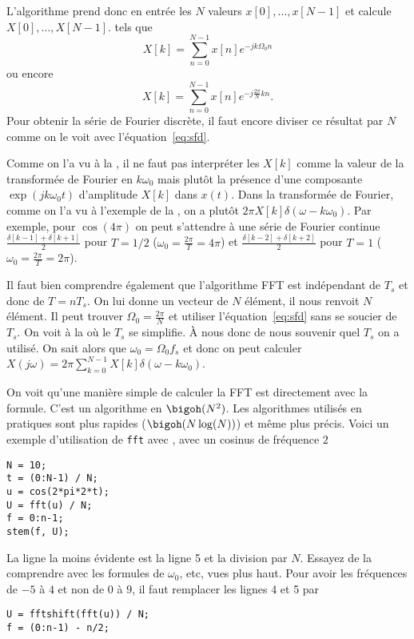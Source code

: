 L'algorithme prend donc en entrée les $N$ valeurs $x[0], \ldots, x[N-1]$ et calcule
$X[0], \ldots, X[N-1]$.
tels que
\[ X[k] = \sum_{n=0}^{N-1}x[n]e^{-jk\Omega_0n} \]
ou encore
\[ X[k] = \sum_{n=0}^{N-1}x[n]e^{-j\frac{2\pi}{N} kn}. \]
Pour obtenir la série de Fourier discrète,
il faut encore diviser ce résultat par $N$
comme on le voit avec l'équation~\eqref{eq:sfd}.

Comme on l'a vu à la ,
il ne faut pas interpréter les $X[k]$ comme la valeur de
la transformée de Fourier en $k\omega_0$ mais plutôt la présence
d'une composante $\exp(jk\omega_0 t)$ d'amplitude $X[k]$
dans $x(t)$.
Dans la transformée de Fourier, comme on l'a vu
à l'exemple de la ,
on a plutôt $2\pi X[k] \delta(\omega - k\omega_0)$.
Par exemple, pour $\cos(4\pi)$ on peut s'attendre à
une série de Fourier continue $\frac{\delta[k-1]+\delta[k+1]}{2}$
pour $T = 1/2$ ($\omega_0 = \frac{2\pi}{T} = 4\pi$)
et $\frac{\delta[k-2]+\delta[k+2]}{2}$
pour $T = 1$ ($\omega_0 = \frac{2\pi}{T} = 2\pi$).

Il faut bien comprendre également que l'algorithme FFT
est indépendant de $T_s$ et donc de $T = nT_s$.
On lui donne un vecteur de $N$ élément, il nous renvoit $N$
élément.
Il peut trouver $\Omega_0 = \frac{2\pi}{N}$ et utiliser
l'équation~\eqref{eq:sfd} sans se soucier de $T_s$.
On voit à la  où le $T_s$ se simplifie.
À nous donc de nous souvenir quel $T_s$ on a utilisé.
On sait alors que $\omega_0 = \Omega_0 f_s$ et donc on peut
calculer
$X(j\omega) = 2\pi \sum_{k=0}^{N-1} X[k] \delta(\omega - k\omega_0)$.

On voit qu'une manière simple de calculer la FFT est directement
avec la formule.
C'est un algorithme en $\bigoh(N^2)$.
Les algorithmes utilisés en pratiques sont plus rapides ($\bigoh(N\log(N))$)
et même plus précis.
Voici un exemple d'utilisation de \lstinline|fft| avec \matlab{},
avec un cosinus de fréquence $2$
\begin{lstlisting}
N = 10;
t = (0:N-1) / N;
u = cos(2*pi*2*t);
U = fft(u) / N;
f = 0:n-1;
stem(f, U);
\end{lstlisting}
La ligne la moins évidente est la ligne 5 et la division par $N$.
Essayez de la comprendre avec les formules de $\omega_0$, etc, vues plus haut.
Pour avoir les fréquences de $-5$ à $4$ et non de $0$ à $9$,
il faut remplacer les lignes 4 et 5 par
\begin{lstlisting}
U = fftshift(fft(u)) / N;
f = (0:n-1) - n/2;
\end{lstlisting}

